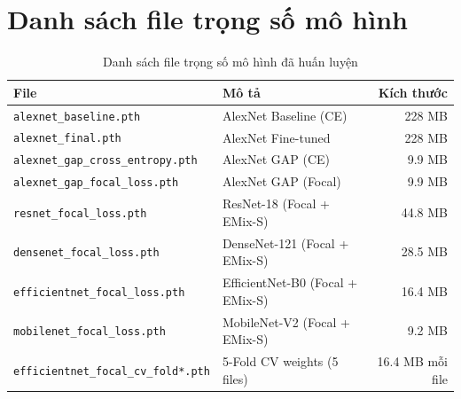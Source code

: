 \section{Danh sách file trọng số mô hình}
\label{sec:model_weights}

\begin{table}[H]
\centering
\caption{Danh sách file trọng số mô hình đã huấn luyện}
\label{tab:model_weights}
\begin{tabularx}{\textwidth}{l X r}
\toprule
\textbf{File} & \textbf{Mô tả} & \textbf{Kích thước} \\
\midrule
\texttt{alexnet\_baseline.pth} & AlexNet Baseline (CE) & 228 MB \\
\texttt{alexnet\_final.pth} & AlexNet Fine-tuned & 228 MB \\
\texttt{alexnet\_gap\_cross\_entropy.pth} & AlexNet GAP (CE) & 9.9 MB \\
\texttt{alexnet\_gap\_focal\_loss.pth} & AlexNet GAP (Focal) & 9.9 MB \\
\texttt{resnet\_focal\_loss.pth} & ResNet-18 (Focal + EMix-S) & 44.8 MB \\
\texttt{densenet\_focal\_loss.pth} & DenseNet-121 (Focal + EMix-S) & 28.5 MB \\
\texttt{efficientnet\_focal\_loss.pth} & EfficientNet-B0 (Focal + EMix-S) & 16.4 MB \\
\texttt{mobilenet\_focal\_loss.pth} & MobileNet-V2 (Focal + EMix-S) & 9.2 MB \\
\texttt{efficientnet\_focal\_cv\_fold*.pth} & 5-Fold CV weights (5 files) & 16.4 MB mỗi file \\
\bottomrule
\end{tabularx}
\end{table}
